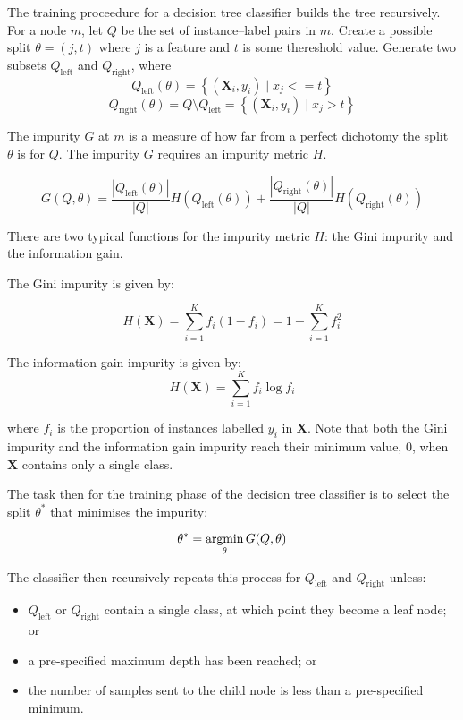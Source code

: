         The training proceedure for a decision tree classifier builds the tree recursively. For a node $m$, let $Q$ be the set of instance--label pairs in $m$. Create a possible split $\theta = (j, t)$ where $j$ is a feature and $t$ is some thereshold value. Generate two subsets $Q_\mathrm{left}$ and $Q_\mathrm{right}$, where 
        $$Q_\mathrm{left}(\theta) = \left\{ (\mathbf{X}_i,y_i) \mid x_j <= t \right \}$$
        $$Q_\mathrm{right}(\theta) = Q \setminus Q_\mathrm{left} = \left\{ (\mathbf{X}_i,y_i) \mid x_j > t \right \}$$
      
        The impurity $G$ at $m$ is a measure of how far from a perfect dichotomy the split $\theta$ is for $Q$. The impurity $G$ requires an impurity metric $H$.
      
        $$G(Q, \theta) = \frac{|Q_\mathrm{left}(\theta)|}{|Q|} H(Q_\mathrm{left}(\theta)) + \frac{|Q_\mathrm{right}(\theta)|}{|Q|} H(Q_\mathrm{right}(\theta))$$
        
        
        
        There are two typical functions for the impurity metric $H$: the Gini impurity and the information gain. 
        
        The Gini impurity is given by:
      
        $$H(\mathbf{X}) = \sum \limits_{i=1}^K f_i(1-f_i) = 1 - \sum \limits_{i=1}^K f_i^2$$
      
        The information gain impurity is given by:
        $$H(\mathbf{X}) = \sum \limits_{i=1}^K f_i \log f_i$$
      
        where $f_i$ is the proportion of instances labelled $y_i$ in $\mathbf{X}$. Note that both the Gini impurity and the information gain impurity reach their minimum value, $0$, when $\mathbf{X}$ contains only a single class.
      
        The task then for the training phase of the decision tree classifier is to select the split $\theta^*$ that minimises the impurity:
      
        $$\theta^* = \operatorname*{argmin}_\theta G(Q, \theta)$$
      
        The classifier then recursively repeats this process for $Q_\mathrm{left}$ and $Q_\mathrm{right}$ unless:
        \begin{itemize}
          \item $Q_\mathrm{left}$ or $Q_\mathrm{right}$ contain a single class, at which point they become a leaf node; or
          \item a pre-specified maximum depth has been reached; or
          \item the number of samples sent to the child node is less than a pre-specified minimum.
        \end{itemize}
      
